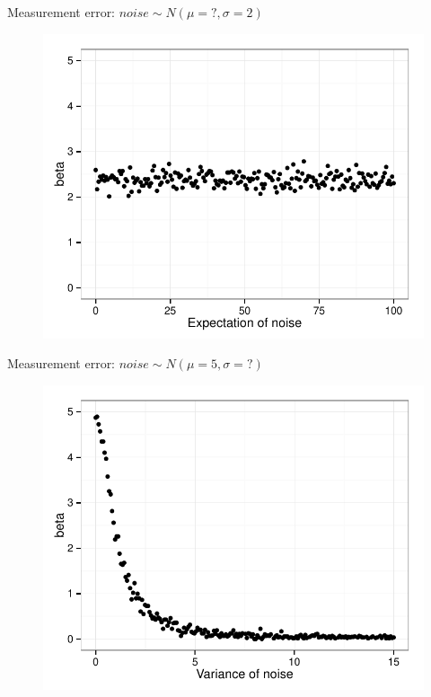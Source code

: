 \documentclass[handout]{beamer}
\begin{document}
\begin{frame}{Measurement error: $noise \sim N(\mu = ?,\sigma = 2)$}
\begin{figure}
\includegraphics[scale=0.8]{ols4.pdf}
\end{figure}
\end{frame}

\begin{frame}{Measurement error: $noise \sim N(\mu = 5,\sigma = ?)$}
\begin{figure}
\includegraphics[scale=0.8]{ols3.pdf}
\end{figure}
\end{frame}
\end{document}
